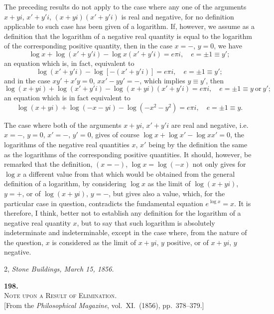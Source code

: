 \documentclass[11pt]{article}
\begin{document}
\medskip
The preceding results do not apply to the case where any one of the arguments $x+yi$, $x'+y'i$, $(x+yi)(x'+y'i)$ is real and negative, for no definition applicable to such case has been given of a logarithm. If, however, we assume as a definition that the logarithm of a negative real quantity is equal to the logarithm of the corresponding positive quantity, then in the case $x=-$, $y=0$, we have
\[
\log x + \log(x'+y'i) - \log x(x'+y'i) = e\pi i,\quad e=\pm 1\equiv y';
\]
an equation which is, in fact, equivalent to
\[
\log(x'+y'i)-\log[-(x'+y'i)]=e\pi i,\quad e=\pm 1\equiv y';
\]
and in the case $xy'+x'y=0$, $xx'-yy'=-$, which implies $y\equiv y'$, then
\[
\log(x+yi)+\log(x'+y'i)-\log(x+yi)(x'+y'i)=e\pi i,\quad e=\pm 1\equiv y\ \text{or}\ y';
\]
an equation which is in fact equivalent to
\[
\log(x+yi)+\log(-x-yi)-\log(-x^{2}-y^{2})=e\pi i,\quad e=\pm 1\equiv y.
\]

The case where both of the arguments $x+yi$, $x'+y'i$ are real and negative, i.e.\ $x=-$, $y=0$, $x'=-$, $y'=0$, gives of course $\log x + \log x' - \log xx' = 0$, the logarithms of the negative real quantities $x$, $x'$ being by the definition the same as the logarithms of the corresponding positive quantities. It should, however, be remarked that the definition, $(x=-)$, $\log x = \log(-x)$ not only gives for $\log x$ a different value from that which would be obtained from the general definition of a logarithm, by considering $\log x$ as the limit of $\log(x+yi)$, $y=+$, or of $\log(x+yi)$, $y=-$, but gives also a value, which, for the particular case in question, contradicts the fundamental equation $e^{\log x}=x$. It is therefore, I think, better not to establish any definition for the logarithm of a negative real quantity $x$, but to say that such logarithm is absolutely indeterminate and indeterminable, except in the case where, from the nature of the question, $x$ is considered as the limit of $x+yi$, $y$ positive, or of $x+yi$, $y$ negative.

\medskip
\hfill 2, \emph{Stone Buildings, March 15, 1856.}

\clearpage


\begin{center}
\textbf{\large 198.}\\[6pt]
\textsc{Note upon a Result of Elimination.}\\[4pt]
\small [From the \emph{Philosophical Magazine}, vol.\ XI.\ (1856), pp.\ 378--379.]
\end{center}
\end{document}
